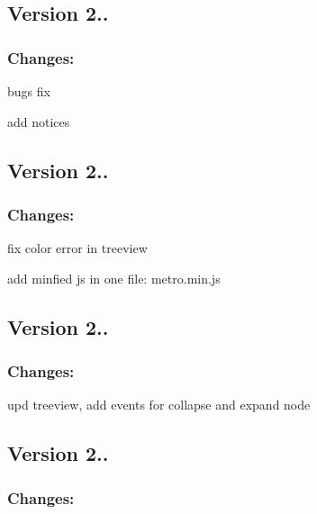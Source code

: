 \subsection*{Version 2..}

\subsubsection*{Changes\-:}


\begin{DoxyItemize}
\item bugs fix
\item add notices
\end{DoxyItemize}

\subsection*{Version 2..}

\subsubsection*{Changes\-:}


\begin{DoxyItemize}
\item fix color error in treeview
\item add minfied js in one file\-: metro.\-min.\-js
\end{DoxyItemize}

\subsection*{Version 2..}

\subsubsection*{Changes\-:}


\begin{DoxyItemize}
\item upd treeview, add events for collapse and expand node
\end{DoxyItemize}

\subsection*{Version 2..}

\subsubsection*{Changes\-:}


